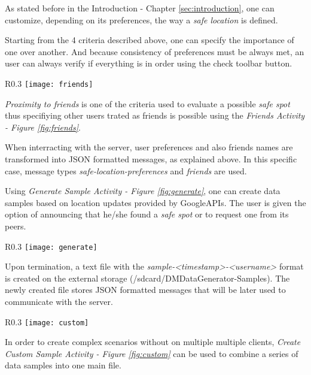 As stated before in the Introduction - Chapter \ref{sec:introduction}, one can customize, depending on its preferences, the way a \textit{safe location} is defined.

Starting from the 4 criteria described above, one can specify the importance of one over another. And because consistency of preferences must be always met, an user can always verify if everything is in order using the check toolbar button.

\begin{wrapfigure}{R}{0.3\textwidth}
\centering
\texttt{[image: friends]}
\caption{\label{fig:friends}Friends Activity}
\end{wrapfigure}

\textit{Proximity to friends} is one of the criteria used to evaluate a possible \textit{safe spot} thus specifiying other users trated as friends is possible using the \textit{Friends Activity - Figure \ref{fig:friends}}.

When interracting with the server, user preferences and also friends names are transformed into JSON formatted messages, as explained above. In this specific case, message types \textit{safe-location-preferences} and \textit{friends} are used.

Using \textit{Generate Sample Activity - Figure \ref{fig:generate}}, one can create data samples based on location updates provided by GoogleAPIs. The user is given the option of announcing that he/she found a \textit{safe spot} or to request one from its peers.

\begin{wrapfigure}{R}{0.3\textwidth}
\centering
\texttt{[image: generate]}
\caption{\label{fig:generate}Generate Sample Activity}
\end{wrapfigure}

Upon termination, a text file with the \textit{sample-<timestamp>-<username>} format is created on the external storage (/sdcard/DMDataGenerator-Samples). The newly created file stores JSON formatted messages that will be later used to communicate with the server.

\begin{wrapfigure}{R}{0.3\textwidth}
\centering
\texttt{[image: custom]}
\caption{\label{fig:custom}Create Custom Sample Activity}
\end{wrapfigure}

In order to create complex scenarios without on multiple multiple clients, \textit{Create Custom Sample Activity - Figure \ref{fig:custom}} can be used to combine a series of data samples into one main file.

